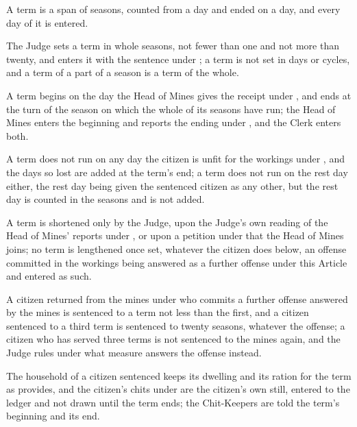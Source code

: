 A term is a span of seasons, counted from a day and ended on a day, and every day of it is entered.

\begin{clauses}
\item The Judge sets a term in whole seasons, not fewer than one and not more than twenty, and enters it with the sentence under ; a term is not set in days or cycles, and a term of a part of a season is a term of the whole.
\item A term begins on the day the Head of Mines gives the receipt under , and ends at the turn of the season on which the whole of its seasons have run; the Head of Mines enters the beginning and reports the ending under , and the Clerk enters both.
\item A term does not run on any day the citizen is unfit for the workings under , and the days so lost are added at the term's end; a term does not run on the rest day either, the rest day being given the sentenced citizen as any other, but the rest day is counted in the seasons and is not added.
\item A term is shortened only by the Judge, upon the Judge's own reading of the Head of Mines' reports under , or upon a petition under  that the Head of Mines joins; no term is lengthened once set, whatever the citizen does below, an offense committed in the workings being answered as a further offense under this Article and entered as such.
\item A citizen returned from the mines under  who commits a further offense answered by the mines is sentenced to a term not less than the first, and a citizen sentenced to a third term is sentenced to twenty seasons, whatever the offense; a citizen who has served three terms is not sentenced to the mines again, and the Judge rules under  what measure answers the offense instead.
\item The household of a citizen sentenced keeps its dwelling and its ration for the term as  provides, and the citizen's chits under  are the citizen's own still, entered to the ledger and not drawn until the term ends; the Chit-Keepers are told the term's beginning and its end.
\end{clauses}


